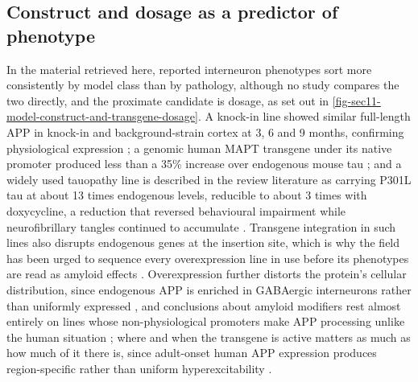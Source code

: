 \documentclass[11pt]{article}
\begin{document}
\begin{figure}[H]
\label{fig-sec11-genetic-label-fidelity}
\end{figure}

\subsection{Construct and dosage as a predictor of phenotype}
\label{sec-11-construct-dosage}

In the material retrieved here, reported interneuron phenotypes sort more consistently by model class than by pathology, although no study compares the two directly, and the proximate candidate is dosage, as set out in \ref{fig-sec11-model-construct-and-transgene-dosage}. A knock-in line showed similar full-length APP in knock-in and background-strain cortex at 3, 6 and 9 months, confirming physiological expression \citep{Yeapuri2025}; a genomic human MAPT transgene under its native promoter produced less than a 35\% increase over endogenous mouse tau \citep{Guo2013}; and a widely used tauopathy line is described in the review literature as carrying P301L tau at about 13 times endogenous levels, reducible to about 3 times with doxycycline, a reduction that reversed behavioural impairment while neurofibrillary tangles continued to accumulate \citep{Sahara2023}. Transgene integration in such lines also disrupts endogenous genes at the insertion site, which is why the field has been urged to sequence every overexpression line in use before its phenotypes are read as amyloid effects \citep{Sasaguri2022}. Overexpression further distorts the protein's cellular distribution, since endogenous APP is enriched in GABAergic interneurons rather than uniformly expressed \citep{Rice2020}, and conclusions about amyloid modifiers rest almost entirely on lines whose non-physiological promoters make APP processing unlike the human situation \citep{Xie2021,SchedinWeiss2020}; where and when the transgene is active matters as much as how much of it there is, since adult-onset human APP expression produces region-specific rather than uniform hyperexcitability \citep{Goettemoeller2024}.
\end{document}
